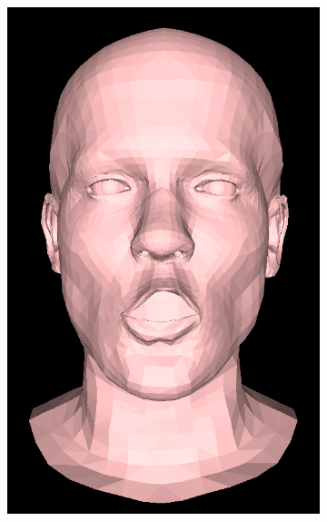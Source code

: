 \begin{figure}[h]
\begin{subfigure}[b]{0.24\textwidth}
        \includegraphics[width=\textwidth]{figures/blendshape_interp/2/00003.png}
    \end{subfigure}
    \begin{subfigure}[b]{0.24\textwidth}

\end{subfigure}
\end{figure}
